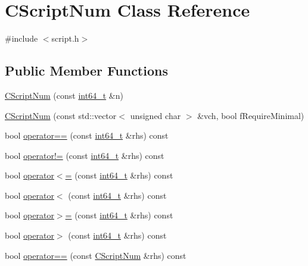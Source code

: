 \hypertarget{class_c_script_num}{}\section{C\+Script\+Num Class Reference}
\label{class_c_script_num}


{\ttfamily \#include $<$script.\+h$>$}

\subsection*{Public Member Functions}
\begin{DoxyCompactItemize}
\item 
\hyperlink{class_c_script_num_abd546b6e7786ba70aeeb81e218d055bc}{C\+Script\+Num} (const \hyperlink{stdint_8h_adec1df1b8b51cb32b77e5b86fff46471}{int64\+\_\+t} \&n)
\item 
\hyperlink{class_c_script_num_a936fb594ed65099e7bf0dd8b2b7a237f}{C\+Script\+Num} (const std\+::vector$<$ unsigned char $>$ \&vch, bool f\+Require\+Minimal)
\item 
bool \hyperlink{class_c_script_num_aee8614a7d617f19a013d9153b2ae8935}{operator==} (const \hyperlink{stdint_8h_adec1df1b8b51cb32b77e5b86fff46471}{int64\+\_\+t} \&rhs) const 
\item 
bool \hyperlink{class_c_script_num_a2e0863436a79af14f9f12ba5b7273956}{operator!=} (const \hyperlink{stdint_8h_adec1df1b8b51cb32b77e5b86fff46471}{int64\+\_\+t} \&rhs) const 
\item 
bool \hyperlink{class_c_script_num_a8fc4407cbbe5c0dcff4ac29f4df90094}{operator$<$=} (const \hyperlink{stdint_8h_adec1df1b8b51cb32b77e5b86fff46471}{int64\+\_\+t} \&rhs) const 
\item 
bool \hyperlink{class_c_script_num_abdd8282d14d3bbec06870738382ff273}{operator$<$} (const \hyperlink{stdint_8h_adec1df1b8b51cb32b77e5b86fff46471}{int64\+\_\+t} \&rhs) const 
\item 
bool \hyperlink{class_c_script_num_ae3d84e811252420503b1fb1023e8634d}{operator$>$=} (const \hyperlink{stdint_8h_adec1df1b8b51cb32b77e5b86fff46471}{int64\+\_\+t} \&rhs) const 
\item 
bool \hyperlink{class_c_script_num_a683de19baa777f9dd893f4eeb5f5f4d6}{operator$>$} (const \hyperlink{stdint_8h_adec1df1b8b51cb32b77e5b86fff46471}{int64\+\_\+t} \&rhs) const 
\item 
bool \hyperlink{class_c_script_num_a0e4ca77274d40a56cd33626728ded1e5}{operator==} (const \hyperlink{class_c_script_num}{C\+Script\+Num} \&rhs) const 

\end{DoxyCompactItemize}
